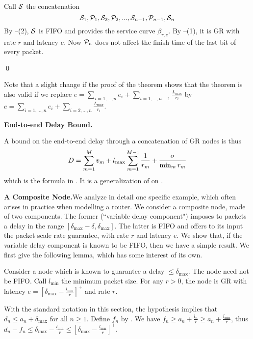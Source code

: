 Call $\mathcal S$ the concatenation
 $$\mathcal S_1, \mathcal P_1, \mathcal S_2,
\mathcal P_2,...,\mathcal S_{n-1},\mathcal P_{n-1},\mathcal S_n$$ By
--(2), $\mathcal S$ is FIFO and provides the
service curve $\beta_{r,e}$. By --(1), it
is GR with rate $r$ and latency $e$. Now $\mathcal P_n$ does not
affect the finish time of the last bit of every packet.

\qed

Note that a slight change if the proof of the theorem shows
that the theorem is also valid if we replace $e=
\sum_{i=1,...,n} e_i + \sum_{i=1,...,n-1}\frac{L_{\max}}{r_i}$
by $e= \sum_{i=1,...,n} e_i +
\sum_{i=2,...,n}\frac{L_{\max}}{r_i}$.

\textbf{End-to-end Delay Bound.}

A bound on the end-to-end delay through a concatenation of GR
nodes is thus
\begin{equation}\mylabel{eq-e2e-dlgr}
 D=\sum_{m=1}^M v_m + l_{\max}\sum_{m=1}^{M-1} \frac{1}{r_m}+ \frac{\sigma}{\min_m r_m}
\end{equation}
which is the formula in \cite{GLV95}. It is a generalization of
 on .

\textbf{A Composite Node.}We analyze in detail one specific
example, which often arises in practice when modelling a
router. We consider a composite node, made of two components.
The former (``variable delay component") imposes to packets a
delay in the range $[\delta_{\max}-\delta, \delta_{\max}]$.
The latter is FIFO and offers to its input the packet scale
rate guarantee, with rate $r$ and latency $e$. We show that,
if the variable delay component is known to be FIFO, then we
have a simple result. We first give the following lemma, which
has some interest of its own.

\begin{lemma}
 Consider a node which is known to
guarantee a delay $\leq \delta_{\max}$. The node need not be
FIFO. Call $l_{\min}$ the minimum packet size. For any $r>0$,
the node is GR with latency
$e=[\delta_{\max}-\frac{l_{\min}}{r}]^+$ and rate $r$.
\end{lemma}

\pr With the standard notation in this section, the hypothesis
implies that $d_n \leq a_n + \delta_{\max}$ for all $n \geq
1$. Define $f_n$  by . We have $f_n\geq a_n +
\frac{l_n}{r} \geq a_n + \frac{l_{\min}}{r}$, thus $d_n-f_n
\leq \delta_{\max} - \frac{l_{\min}}{r}\leq
[\delta_{\max}-\frac{l_{\min}}{r}]^+$.

